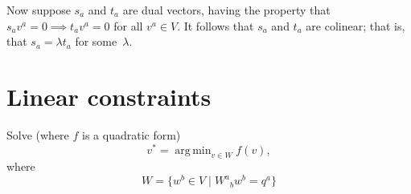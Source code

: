 \documentclass[10pt, a4paper]{article}
\DeclareMathOperator*{\argmin}{arg\,min}
\begin{document}
Now suppose $s_a$ and $t_a$ are dual vectors, having the property that
$s_av^a = 0 \implies t_av^a=0$ for all $v^a\in V$. It follows that
$s_a$ and $t_a$ are colinear; that is, that $s_a=\lambda t_a$ for some~$\lambda$. 






\section{Linear constraints}

Solve (where $f$ is a quadratic form)
\begin{equation*}
    \label{eq:linear-constraint}
    v^* = \argmin_{v\in W} f(v), 
\end{equation*}
where
\begin{equation*}
    W=\{w^b \in V \mid W^a{}_b w^b = q^a\}
\end{equation*}











\end{document}
